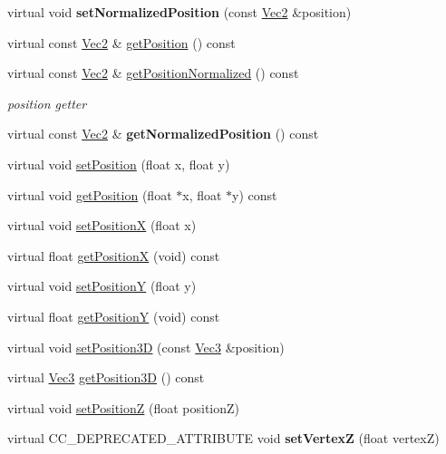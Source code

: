 \begin{Indent}
\begin{DoxyCompactItemize}
\mbox{\label{classNode_ab3b4779b7bb240c9a6467142a360685c}} 
virtual void {\bfseries set\+Normalized\+Position} (const \hyperlink{classVec2}{Vec2} \&position)
\item 
virtual const \hyperlink{classVec2}{Vec2} \& \hyperlink{classNode_a47e9123d87921aefc06960a5089c995d}{get\+Position} () const
\item 
virtual const \hyperlink{classVec2}{Vec2} \& \hyperlink{classNode_ae9d2fb3ed00ccc33d22c1f903622950f}{get\+Position\+Normalized} () const
\begin{DoxyCompactList}\small\item\em position getter \end{DoxyCompactList}\item 
\mbox{\label{classNode_a468e84257f42e045c3ffcb68aaa363f1}} 
virtual const \hyperlink{classVec2}{Vec2} \& {\bfseries get\+Normalized\+Position} () const
\item 
virtual void \hyperlink{classNode_aa23be53d56922c9ee20ff63ec296a1f7}{set\+Position} (float x, float y)
\item 
virtual void \hyperlink{classNode_ad48898f3e8629cf9f7da78b0ae0c68ae}{get\+Position} (float $\ast$x, float $\ast$y) const
\item 
virtual void \hyperlink{classNode_a2b26ff930ebb0b241bc40b7f573be417}{set\+PositionX} (float x)
\item 
virtual float \hyperlink{classNode_a39284a5629f41cc50054e538ab28f5ab}{get\+PositionX} (void) const
\item 
virtual void \hyperlink{classNode_acec74667c8b24b5164e536b999bc8eaa}{set\+PositionY} (float y)
\item 
virtual float \hyperlink{classNode_ac6335e604f0c11512e45f607f38e72ec}{get\+PositionY} (void) const
\item 
virtual void \hyperlink{classNode_ad3343ed96ab373ab30bef52123179a86}{set\+Position3D} (const \hyperlink{classVec3}{Vec3} \&position)
\item 
virtual \hyperlink{classVec3}{Vec3} \hyperlink{classNode_a7c3cc76f19c34ce2d4edd48bece7731b}{get\+Position3D} () const
\item 
virtual void \hyperlink{classNode_acf44e31f8e5d05e54e5594228406ed76}{set\+PositionZ} (float positionZ)
\item 
\mbox{\label{classNode_ae6caed983c3f8d7686ebd602bb27de08}} 
virtual C\+C\+\_\+\+D\+E\+P\+R\+E\+C\+A\+T\+E\+D\+\_\+\+A\+T\+T\+R\+I\+B\+U\+TE void {\bfseries set\+VertexZ} (float vertexZ)

\end{DoxyCompactItemize}
\end{Indent}
